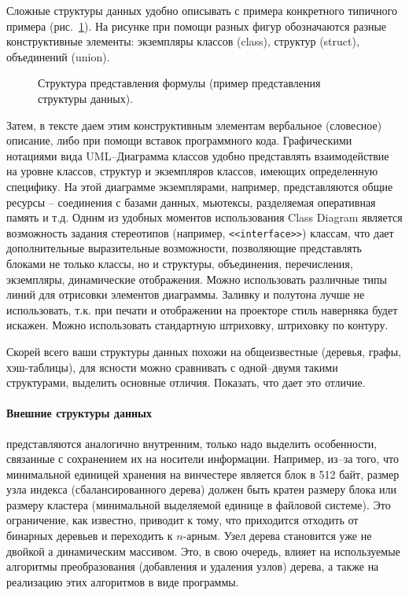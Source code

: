 \documentclass[a4paper,14pt,final]{extreport}
\begin{document}
Сложные структуры данных удобно описывать с примера конкретного типичного примера (рис.~\ref{fig:datastructex}).  На рисунке при помощи разных фигур обозначаются разные конструктивные элементы: экземпляры классов (class), структур (struct), объединений (union).
\begin{figure}[hbt]
  \centering

  \caption[Пример структуры данных]{Структура представления формулы (пример представления структуры данных).}
  \label{fig:datastructex}
\end{figure}
Затем, в тексте даем этим конструктивным элементам вербальное (словесное) описание, либо при помощи вставок программного кода.  Графическими нотациями вида UML\;--\;Диаграмма классов удобно представлять взаимодействие на уровне классов, структур и экземпляров классов, имеющих определенную специфику.  На этой диаграмме экземплярами, например, представляются общие ресурсы -- соединения с базами данных, мьютексы, разделяемая оперативная память и т.д.  Одним из удобных моментов использования Class Diagram является возможность задания стереотипов (например, \texttt{<<interface>>}) классам, что дает дополнительные выразительные возможности, позволяющие представлять блоками не только классы, но и структуры, объединения, перечисления, экземпляры, динамические отображения.  Можно использовать различные типы линий для отрисовки элементов диаграммы.  Заливку и полутона лучше не использовать, т.к. при печати и отображении на проекторе стиль наверняка будет искажен.  Можно использовать стандартную штриховку, штриховку по контуру.

Скорей всего ваши структуры данных похожи на общеизвестные (деревья, графы, хэш-таблицы), для ясности можно сравнивать с одной--двумя такими структурами, выделить основные отличия.  Показать, что дает это отличие.


\paragraph{Внешние структуры данных} представляются аналогично внутренним, только надо выделить особенности, связанные с сохранением их на носители информации.  Например, из--за того, что минимальной единицей хранения на винчестере является блок в 512 байт, размер узла индекса (сбалансированного дерева) должен быть кратен размеру блока или размеру кластера (минимальной выделяемой единице в файловой системе).  Это ограничение, как известно, приводит к тому, что приходится отходить от бинарных деревьев и переходить к $n$-арным.  Узел дерева становится уже не двойкой а динамическим массивом.  Это, в свою очередь, влияет на используемые алгоритмы преобразования (добавления и удаления узлов) дерева, а также на реализацию этих алгоритмов в виде программы.
\end{document}
